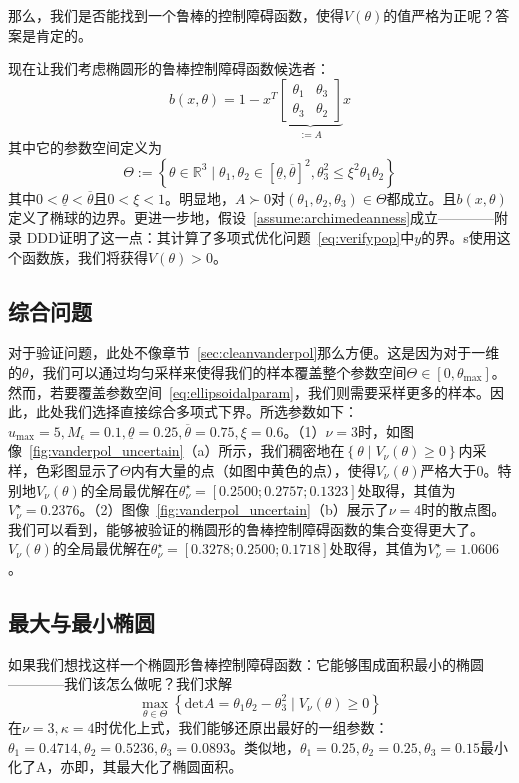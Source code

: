 那么，我们是否能找到一个鲁棒的控制障碍函数，使得$V(\theta)$的值严格为正呢？答案是肯定的。

现在让我们考虑椭圆形的鲁棒控制障碍函数候选者：
\begin{equation}\label{eq:ellipsoidalcbf}
    b(x, \theta) = 1 - x^T \underbrace{
        \left[ \begin{matrix}
            \theta_1 & \theta_3 \\
            \theta_3 & \theta_2
        \end{matrix} \right]
    }_{:= A} x
\end{equation}
其中它的参数空间定义为
\begin{equation}\label{eq:ellipsoidalparam}
    \Theta := \left\{ 
        \theta \in \mathbb{R}^3 \mid \theta_1, \theta_2 \in [\underline{\theta}, \overline{\theta}]^2, \theta_3^2 \le \xi^2 \theta_1 \theta_2
     \right\}
\end{equation}
其中$0 < \underline{\theta} < \overline{\theta}$且$0 < \xi < 1$。明显地，$A \succ 0$对$(\theta_1, \theta_2, \theta_3) \in \Theta$都成立。且$b(x, \theta)$定义了椭球的边界。更进一步地，假设~\ref{assume:archimedeanness}成立————附录{\color{red} DDD}证明了这一点：其计算了多项式优化问题~\eqref{eq:verifypop}中$y$的界。s使用这个函数族，我们将获得$V(\theta) > 0$。

\subsection{综合问题}
对于验证问题，此处不像章节~\ref{sec:cleanvanderpol}那么方便。这是因为对于一维的$\theta$，我们可以通过均匀采样来使得我们的样本覆盖整个参数空间$\Theta \in [0, \theta_{\max}]$。然而，若要覆盖参数空间~\eqref{eq:ellipsoidalparam}，我们则需要采样更多的样本。因此，此处我们选择直接综合多项式下界。所选参数如下：$u_{\max} = 5, M_\epsilon = 0.1, \underline{\theta} = 0.25, \overline{\theta} = 0.75, \xi = 0.6$。（1）$\nu = 3$时，如图像~\ref{fig:vanderpol_uncertain}（a）所示，我们稠密地在$\left\{ \theta \mid V_\nu(\theta) \ge 0 \right\}$内采样，色彩图显示了$\Theta$内有大量的点（如图中黄色的点），使得$V_\nu(\theta)$严格大于$0$。特别地$V_\nu(\theta)$的全局最优解在$\theta^\star_\nu = [0.2500;0.2757;0.1323]$处取得，其值为$V^\star_\nu = 0.2376$。（2）图像~\ref{fig:vanderpol_uncertain}（b）展示了$\nu = 4$时的散点图。我们可以看到，能够被验证的椭圆形的鲁棒控制障碍函数的集合变得更大了。$V_\nu(\theta)$的全局最优解在$\theta^\star_\nu = [0.3278;0.2500;0.1718]$处取得，其值为$V^\star_\nu = 1.0606$。

\subsection{最大与最小椭圆}
如果我们想找这样一个椭圆形鲁棒控制障碍函数：它能够围成面积最小的椭圆————我们该怎么做呢？我们求解
\begin{equation}
    \max_{\theta \in \Theta} \left\{ \text{det}A = \theta_1 \theta_2 - \theta_3^2 \mid V_\nu(\theta) \ge 0 \right\}
\end{equation}
在$\nu = 3, \kappa = 4$时优化上式，我们能够还原出最好的一组参数：$\theta_1=0.4714,\theta_2=0.5236,\theta_3 = 0.0893$。类似地，$\theta_1=0.25,\theta_2=0.25,\theta_3 = 0.15$最小化了$\text{A}$，亦即，其最大化了椭圆面积。


